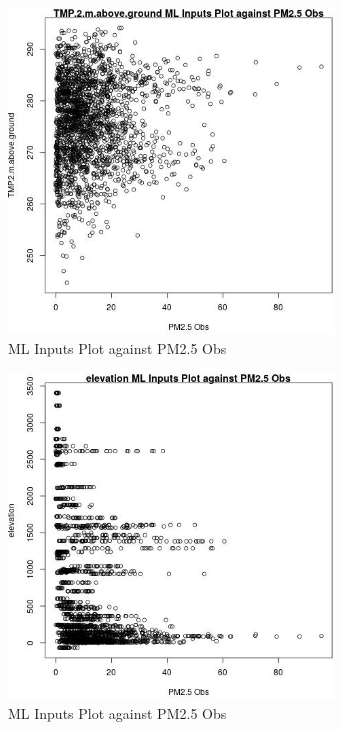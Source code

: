 \begin{figure} 
\centering  
\includegraphics[width=0.77\textwidth]{Code_Outputs/Report_ML_input_PM25_Step4_part_e_de_duplicated_aves_TMP2mabovegroundvPM25_Obs.jpg} 
\caption{\label{fig:Report_ML_input_PM25_Step4_part_e_de_duplicated_avesTMP2mabovegroundvPM25_Obs}ML Inputs Plot against PM2.5 Obs} 
\end{figure} 
 

\begin{figure} 
\centering  
\includegraphics[width=0.77\textwidth]{Code_Outputs/Report_ML_input_PM25_Step4_part_e_de_duplicated_aves_elevationvPM25_Obs.jpg} 
\caption{\label{fig:Report_ML_input_PM25_Step4_part_e_de_duplicated_aveselevationvPM25_Obs}ML Inputs Plot against PM2.5 Obs} 
\end{figure} 
 
